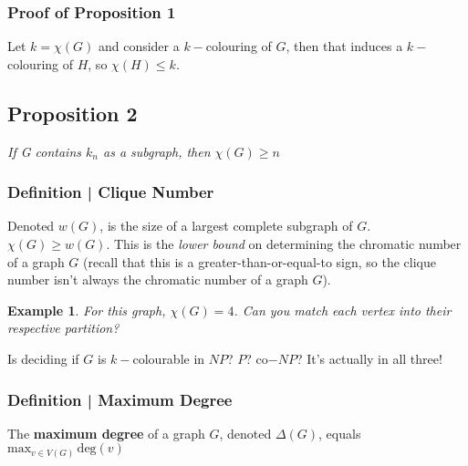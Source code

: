 \documentclass{report}
\newtheorem{ex}{Example}[section]
\begin{document}
\subsubsection{Proof of Proposition 1}
Let $k=\chi(G)$ and consider a $k-$colouring of $G$, then that induces a $k-$colouring of $H$, so $\chi(H) \leq k$.
\subsection{Proposition 2}
\begin{center}
\textit{If G contains $k_n$ as a subgraph, then $\chi(G) \geq n$}
\end{center}
\subsubsection{Definition | Clique Number}
Denoted $w(G)$, is the size of a largest complete subgraph of $G$. $\chi(G) \geq w(G)$. This is the \textit{lower bound} on determining the chromatic number of a graph $G$ (recall that this is a greater-than-or-equal-to sign, so the clique number isn't always the chromatic number of a graph $G$).
\begin{ex}
For this graph, $\chi(G) = 4$. Can you match each vertex into their respective partition?
\end{ex}
\begin{center}
\end{center}
Is deciding if $G$ is $k-$colourable in $NP$? $P$? co$-NP$? It's actually in all three!
\subsubsection{Definition | Maximum Degree}
The \textbf{maximum degree} of a graph $G$, denoted $\Delta(G)$, equals $\mathrm{max}_{v\in V(G)}\, \mathrm{deg}(v)$
\end{document}
